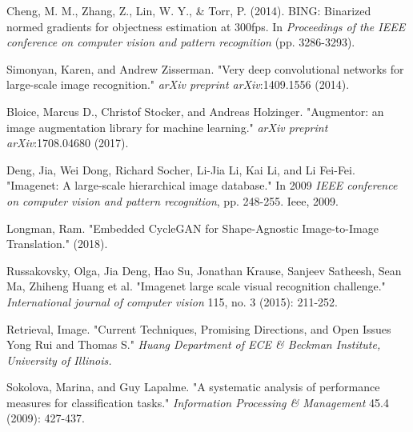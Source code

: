 \documentclass[12pt]{report}
\begin{document}
\begin{thebibliography}{9}
			Cheng, M. M., Zhang, Z., Lin, W. Y., \& Torr, P. (2014). BING: Binarized normed gradients for objectness estimation at 300fps. In \textit{Proceedings of the IEEE conference on computer vision and pattern recognition} (pp. 3286-3293).
																																																																																										
			Simonyan, Karen, and Andrew Zisserman. "Very deep convolutional networks for large-scale image recognition." \textit{arXiv preprint arXiv}:1409.1556 (2014).
																																						
			Bloice, Marcus D., Christof Stocker, and Andreas Holzinger. "Augmentor: an image augmentation library for machine learning." \textit{arXiv preprint arXiv}:1708.04680 (2017).
			
			Deng, Jia, Wei Dong, Richard Socher, Li-Jia Li, Kai Li, and Li Fei-Fei. "Imagenet: A large-scale hierarchical image database." In 2009 \textit{IEEE conference on computer vision and pattern recognition}, pp. 248-255. Ieee, 2009.
			
			Longman, Ram. "Embedded CycleGAN for Shape-Agnostic Image-to-Image Translation." (2018).																																					
			
			Russakovsky, Olga, Jia Deng, Hao Su, Jonathan Krause, Sanjeev Satheesh, Sean Ma, Zhiheng Huang et al. "Imagenet large scale visual recognition challenge." \textit{International journal of computer vision} 115, no. 3 (2015): 211-252.																		
			
			Retrieval, Image. "Current Techniques, Promising Directions, and Open Issues Yong Rui and Thomas S." \textit{Huang Department of ECE \& Beckman Institute, University of Illinois.}		
			
			
			Sokolova, Marina, and Guy Lapalme. "A systematic analysis of performance measures for classification tasks." \textit{Information Processing \& Management} 45.4 (2009): 427-437.
			
		
		
		\end{thebibliography}
																																																																										
\end{document}
